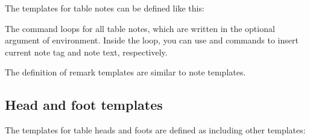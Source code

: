 \documentclass[oneside]{book}
\begin{document}
The templates for table notes can be defined like this:

\begin{codehigh}
\end{codehigh}
\begin{codehigh}
\end{codehigh}

The \CC{\MapTblrNotes} command loops for all table notes,
which are written in the optional argument of  environment.
Inside the loop, you can use \CC{\InsertTblrNoteTag} and \CC{\InsertTblrNoteText}
commands to insert current note tag and note text, respectively.

The definition of remark templates are similar to note templates.
\nopagebreak
\begin{codehigh}
\end{codehigh}
\begin{codehigh}
\end{codehigh}

\subsection{Head and foot templates}

The templates for table heads and foots are defined as including other templates:

\begin{codehigh}
\end{codehigh}
\end{document}
